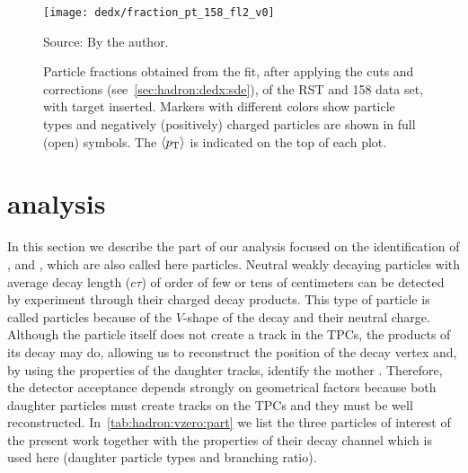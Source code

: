 \begin{figure}
  \centering
  \texttt{[image: dedx/fraction\_pt\_158\_fl2\_v0]}
  \caption{Particle fractions obtained from the \dedx fit,
    after applying the cuts and corrections (see~\cref{sec:hadron:dedx:sde}),
    of the RST and 158 \GeVc data set, with target inserted. Markers with different
    colors show particle types and negatively (positively) charged particles are shown
    in full (open) symbols. The $\langle p_\text{T}\rangle$ is indicated on the top of each plot.}
  \label{fig:hadron:dedx:fit:final158r}
  \begin{center}
    \small Source: By the author. 
  \end{center}
\end{figure}

\clearpage

\section[\vzero analysis]{\boldmath \vzero analysis}
\label{sec:hadron:vzero}

In this section we describe the part of our analysis
focused on the identification of \lamb, \antilamb and \kzeros,
which are also called here \vzero particles.
Neutral weakly decaying particles with average decay length ($c\tau$)
of order of few or tens of centimeters can be detected by \NASixtyOne
experiment through their charged decay products. This type of
particle is called \vzero particles because of the $V$-shape of
the decay and their neutral charge. Although the \vzero
particle itself does not create a track in the TPCs, the products
of its decay may do, allowing us to reconstruct the position of the
decay vertex and, by using the properties of the daughter tracks,
identify the mother \vzero. Therefore, the detector acceptance
depends strongly on geometrical factors because both daughter particles
must create tracks on the TPCs and they must be well reconstructed. 
In~\cref{tab:hadron:vzero:part} we list the three \vzero particles of interest
of the present work together with the properties of their decay channel
which is used here (daughter particle types and branching ratio). 

